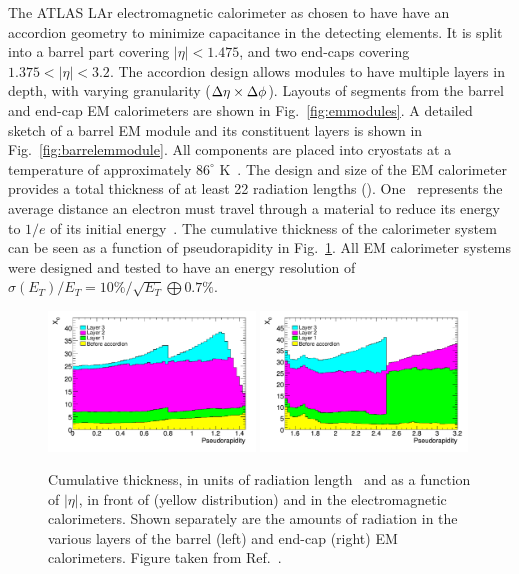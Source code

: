 {The ATLAS LAr electromagnetic calorimeter as chosen to have have an accordion geometry to minimize capacitance in the detecting elements. It is split into a barrel part covering $|\eta|<1.475$, and two end-caps covering $1.375<|\eta|<3.2$. The accordion design allows modules to have multiple layers in depth, with varying granularity ($\mbox{$\Delta \eta$} \times \mbox{$\Delta \phi$}$). Layouts of segments from the barrel and end-cap EM calorimeters are shown in Fig.~\ref{fig:emmodules}. A detailed sketch of a barrel EM module and its constituent layers is shown in Fig.~\ref{fig:barrelemmodule}. All components are placed into cryostats at a temperature of approximately $86^{\circ}$ K~\cite{Bremer:449276}.  The design and size of the EM calorimeter provides a total thickness of at least 22 radiation lengths (\radlen). One \radlen\ represents the average distance an electron must travel through a material to reduce its energy to $1/e$ of its initial energy~\cite{Fabjan:2003aq}. The cumulative thickness of the calorimeter system can be seen as a function of pseudorapidity in Fig.~\ref{fig:radiationlengths}. All EM calorimeter systems were designed and tested to have an energy resolution of $\sigma(E_{T})/E_{T}=10\%/\sqrt{E_{T}}\bigoplus0.7\%$.

\begin{figure}[ht]
	\centerline{
		\includegraphics[width=0.49\textwidth]{figures/radiation_lengths_1.pdf} 
		\includegraphics[width=0.49\textwidth]{figures/radiation_lengths_2.pdf} 
	}
	\caption{Cumulative thickness, in units of radiation length \radlen\ and as a function of $|\eta|$, in front of (yellow distribution) and in the electromagnetic calorimeters. Shown separately are the amounts of radiation in the various layers of the barrel (left) and end-cap (right) EM calorimeters. Figure taken from Ref.~\cite{Aad:2008zzm}. }
	\label{fig:radiationlengths}
\end{figure}

}
